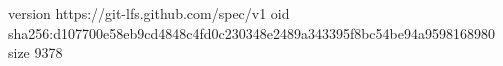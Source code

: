 version https://git-lfs.github.com/spec/v1
oid sha256:d107700e58eb9cd4848c4fd0c230348e2489a343395f8bc54be94a9598168980
size 9378
